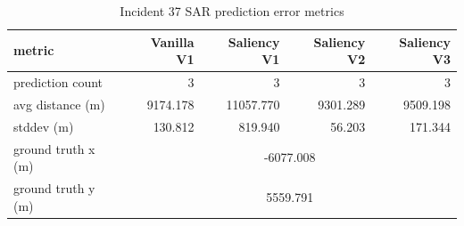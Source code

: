 \begin{table}[ht]
\centering
\caption{Incident 37 SAR prediction error metrics}
\label{tab:sar-incident-37}
\begin{tabular}{lrrrr}
\hline
metric & Vanilla V1 & Saliency V1 & Saliency V2 & Saliency V3 \\
\hline
prediction count & 3 & 3 & 3 & 3 \\
avg distance (m) & 9174.178 & 11057.770 & 9301.289 & 9509.198 \\
stddev (m) & 130.812 & 819.940 & 56.203 & 171.344 \\
ground truth x (m) & \multicolumn{4}{c}{-6077.008} \\
ground truth y (m) & \multicolumn{4}{c}{5559.791} \\
\hline
\end{tabular}
\end{table}
